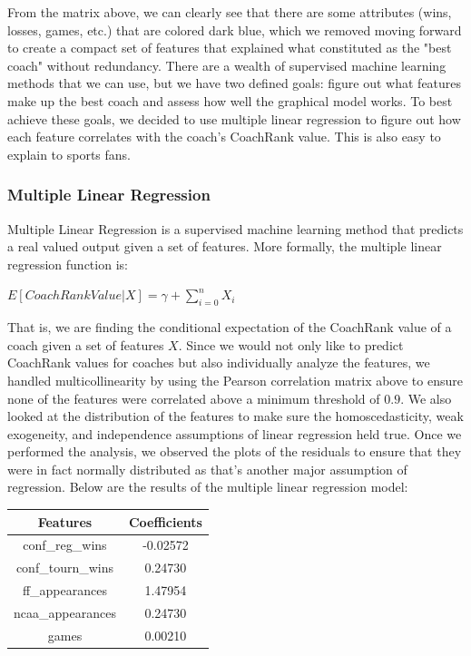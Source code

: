 \documentclass[11pt,notitlepage]{article}
\begin{document}
\noindent From the matrix above, we can clearly see that there are some attributes (wins, losses, games, etc.) that are colored dark blue, which we removed moving forward to create a compact set of features that explained what constituted as the "best coach" without redundancy. There are a wealth of supervised machine learning methods that we can use, but we have two defined goals: figure out what features make up the best coach and assess how well the graphical model works. To best achieve these goals, we decided to use multiple linear regression to figure out how each feature correlates with the coach's CoachRank value. This is also easy to explain to sports fans.

\subsubsection*{Multiple Linear Regression}

Multiple Linear Regression is a supervised machine learning method that predicts a real valued output given a set of features. More formally, the multiple linear regression function is:

\begin{center}
$E[CoachRankValue|X] = \gamma + \sum_{i=0}^{n} X_{i}$
\end{center}

\noindent That is, we are finding the conditional expectation of the CoachRank value of a coach given a set of features $X$. Since we would not only like to predict CoachRank values for coaches but also individually analyze the features, we handled multicollinearity by using the Pearson correlation matrix above to ensure none of the features were correlated above a minimum threshold of $0.9$. We also looked at the distribution of the features to make sure the homoscedasticity, weak exogeneity, and independence assumptions of linear regression held true. Once we performed the analysis, we observed the plots of the residuals to ensure that they were in fact normally distributed as that's another major assumption of regression. Below are the results of the multiple linear regression model:

\begin{center}
\begin{tabular}{ | c | c |}
\hline
Features            & Coefficients \\\hline
conf\_reg\_wins       & -0.02572      \\\hline
conf\_tourn\_wins     & 0.24730     \\\hline
ff\_appearances      &  1.47954    \\\hline
ncaa\_appearances    & 0.24730      \\\hline
games               & 0.00210      \\
\hline
\end{tabular}
\end{center}
\end{document}
